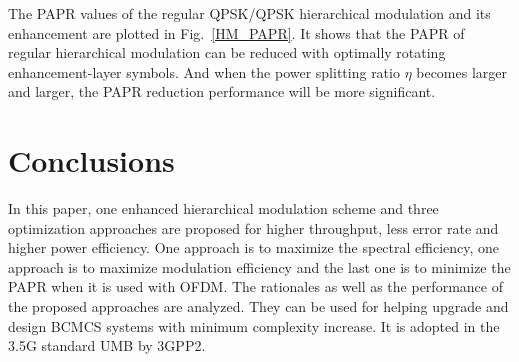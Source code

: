 \documentclass[conference]{IEEEtran}
\begin{document}
The PAPR values of the regular QPSK/QPSK hierarchical modulation
and its enhancement are plotted in Fig.~\ref{HM_PAPR}. It shows
that the PAPR of regular hierarchical modulation can be reduced
with optimally rotating enhancement-layer symbols. And when the
power splitting ratio $\eta$ becomes larger and larger, the PAPR
reduction performance will be more significant.
\begin{figure} 
\end{figure}

\section{Conclusions}
In this paper, one enhanced hierarchical modulation scheme and
three optimization approaches are proposed for higher throughput,
less error rate and higher power efficiency. One approach is to
maximize the spectral efficiency, one approach is to maximize
modulation efficiency and the last one is to minimize the PAPR
when it is used with OFDM. The rationales as well as the
performance of the proposed approaches are analyzed. They can be
used for helping upgrade and design BCMCS systems with minimum
complexity increase. It is adopted in the 3.5G standard UMB by
3GPP2.
\small


\end{document}
